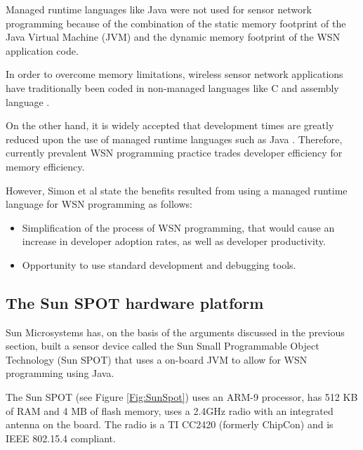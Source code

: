 Managed runtime languages like Java were not used for sensor network programming
because of the combination of the static memory footprint of the Java Virtual
Machine (JVM) and the dynamic memory footprint of the WSN application code.

In order to overcome
memory limitations, wireless sensor network applications have traditionally been
 coded in non-managed languages like C and assembly language
 \cite{simon_squawk:2006}. 
 
 On the other hand, it is widely accepted that development times are greatly reduced
upon the use of managed runtime languages such as Java
\cite{simon_squawk:2006}. Therefore, currently prevalent WSN programming practice
trades developer efficiency for memory efficiency. 

However, Simon et al \cite{simon_squawk:2006} state the benefits resulted from
using a managed runtime language for WSN programming as follows:

\begin{itemize}
  \item Simplification of the process of WSN programming, that would cause an
  increase in developer adoption rates, as well as developer productivity.
  \item Opportunity to use standard development and debugging tools.
\end{itemize}
 
\subsection{The Sun SPOT hardware platform }
Sun Microsystems has, on the basis of the arguments discussed in the previous
section, built a sensor device
called the Sun Small Programmable Object Technology (Sun SPOT) that uses a
on-board JVM to allow for WSN programming using Java.

The Sun SPOT (see Figure \ref{Fig:SunSpot}) uses an ARM-9 processor, has 512 KB of RAM
and 4 MB of flash memory, uses a 2.4GHz radio with an integrated antenna on the board. The radio
is a TI CC2420 (formerly ChipCon) and is IEEE 802.15.4 compliant.

